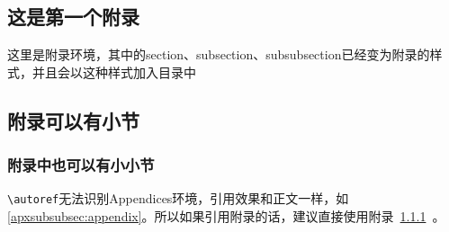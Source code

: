 \documentclass[supercite]{HustGraduTrans}
\begin{document}
    \begin{appendices}
        \section{这是第一个附录}
        这里是附录环境，其中的section、subsection、subsubsection已经变为附录的样式，并且会以这种样式加入目录中
        \subsection{附录可以有小节}
        \subsubsection{附录中也可以有小小节}\label{apxsubsubsec:appendix}
        \verb|\autoref|无法识别Appendices环境，引用效果和正文一样，如\autoref{apxsubsubsec:appendix}。所以如果引用附录的话，建议直接使用附录~\ref{apxsubsubsec:appendix}~。
    \end{appendices}
    
\end{document}
